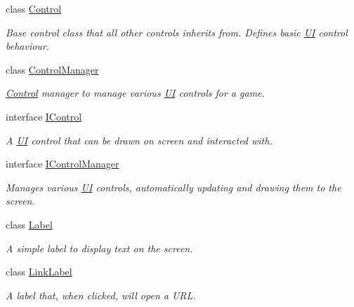 \begin{DoxyCompactItemize}
\item 
class \hyperlink{class_tri_devs_1_1_tri_engine_1_1_u_i_1_1_control}{Control}
\begin{DoxyCompactList}\small\item\em Base control class that all other controls inherits from. Defines basic \hyperlink{namespace_tri_devs_1_1_tri_engine_1_1_u_i}{U\-I} control behaviour. \end{DoxyCompactList}\item 
class \hyperlink{class_tri_devs_1_1_tri_engine_1_1_u_i_1_1_control_manager}{Control\-Manager}
\begin{DoxyCompactList}\small\item\em \hyperlink{class_tri_devs_1_1_tri_engine_1_1_u_i_1_1_control}{Control} manager to manage various \hyperlink{namespace_tri_devs_1_1_tri_engine_1_1_u_i}{U\-I} controls for a game. \end{DoxyCompactList}\item 
interface \hyperlink{interface_tri_devs_1_1_tri_engine_1_1_u_i_1_1_i_control}{I\-Control}
\begin{DoxyCompactList}\small\item\em A \hyperlink{namespace_tri_devs_1_1_tri_engine_1_1_u_i}{U\-I} control that can be drawn on screen and interacted with. \end{DoxyCompactList}\item 
interface \hyperlink{interface_tri_devs_1_1_tri_engine_1_1_u_i_1_1_i_control_manager}{I\-Control\-Manager}
\begin{DoxyCompactList}\small\item\em Manages various \hyperlink{namespace_tri_devs_1_1_tri_engine_1_1_u_i}{U\-I} controls, automatically updating and drawing them to the screen. \end{DoxyCompactList}\item 
class \hyperlink{class_tri_devs_1_1_tri_engine_1_1_u_i_1_1_label}{Label}
\begin{DoxyCompactList}\small\item\em A simple label to display text on the screen. \end{DoxyCompactList}\item 
class \hyperlink{class_tri_devs_1_1_tri_engine_1_1_u_i_1_1_link_label}{Link\-Label}
\begin{DoxyCompactList}\small\item\em A label that, when clicked, will open a U\-R\-L. \end{DoxyCompactList}\end{DoxyCompactItemize}
